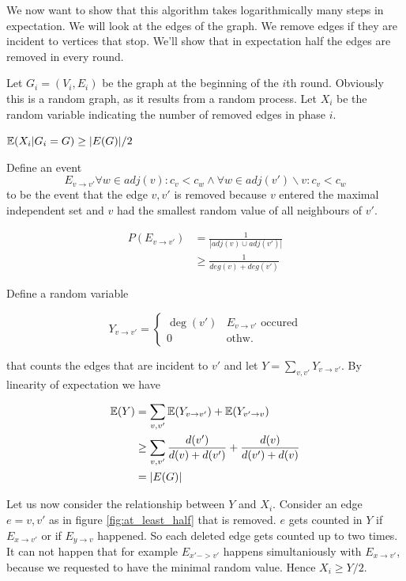 We now want to show that this algorithm takes logarithmically many steps in expectation. We will look at the edges of the graph. We remove edges if they are incident to vertices that stop. We'll show that in expectation half the edges are removed in every round. 

Let $G_i=(V_i,E_i)$ be the graph at the beginning of the $i$th round. Obviously this is a random graph, as it results from a random process. Let $X_i$ be the random variable indicating the number of removed edges in phase $i$.

\begin{lem} \label{lem:at_least_half}$\mathbb{E}(X_i |G_i = G) \geq |E(G)|/2$ \end{lem}

\begin{pr} Define an event
\[E_{v\rightarrow v'} \forall w\in adj(v): c_v<c_w \wedge \forall w\in adj(v') \backslash {v} : c_v < c_w\]
to be the event that the edge ${v,v'}$ is removed because $v$ entered the maximal independent set and $v$ had the smallest random value of all neighbours of $v'$.

\begin{align*}
P(E_{v\rightarrow v'}) &= \frac{1}{| adj(v) \cup adj(v') |}\\
	&\geq \frac{1}{deg(v) + deg(v')}	
\end{align*}

Define a random variable 

\[Y_{v\rightarrow v'} = \begin{cases} \deg(v') & E_{v\rightarrow v'} \text{ occured} \\ 0 & \text{othw.}\end{cases}\]

that counts the edges that are incident to $v'$ and let $Y=\sum_{v,v'} Y_{v\rightarrow v'}$. By linearity of expectation we have

\begin{align*}
\mathbb{E}(Y) &= \sum_{v,v'} \mathbb{E}(Y_{v\rightarrow v'}) + \mathbb{E}(Y_{v'\rightarrow v}) \\
	&\geq \sum_{v,v'} \frac{d(v')}{d(v)+d(v')} + \frac{d(v)}{d(v')+d(v)}\\
	&= |E(G)|
\end{align*}

Let us now consider the relationship between $Y$ and $X_i$. Consider an edge $e={v,v'}$ as in figure \ref{fig:at_least_half} that is removed. $e$ gets counted in $Y$ if $E_{x\rightarrow v'}$ or if $E_{y\rightarrow v}$ happened. So each deleted edge gets counted up to two times. It can not happen that for example $E_{x'->v'}$ happens simultaniously with $E_{x\rightarrow v'}$, because we requested to have the minimal random value. Hence $X_i \geq Y/2$.


\end{pr}
